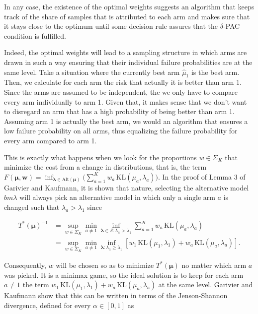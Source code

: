 \documentclass[12pt,]{article}
\newcommand{\KL}{\,\text{KL}}
\begin{document}
In any case, the existence of the optimal weights suggests an algorithm
that keeps track of the share of samples that is attributed to each arm
and makes sure that it stays close to the optimum until some decision
rule assures that the \(\delta\)-PAC condition is fulfilled.

Indeed, the optimal weights will lead to a sampling structure in which
arms are drawn in such a way ensuring that their individual failure
probabilities are at the same level. Take a situation where the
currently best arm \(\hat{\mu}_1\) is the best arm. Then, we calculate
for each arm the risk that actually it is better than arm 1. Since the
arms are assumed to be independent, the we only have to compare every
arm individually to arm 1. Given that, it makes sense that we don't want
to disregard an arm that has a high probability of being better than arm
1. Assuming arm 1 is actually the best arm, we would an algorithm that
ensures a low failure probability on all arms, thus equalizing the
failure probability for every arm compared to arm 1.

This is exactly what happens when we look for the proportions
\(w \in \Sigma_K\) that minimize the cost from a change in
distributions, that is, the term
\(F(\bm{\mu}, \bm{w}) = \inf_{\bm{\lambda} \in \text{Alt}(\bm{\mu})} \Big(\sum_{a= 1}^K w_a \KL(\mu_a, \lambda_a)\Big)\).
In the proof of Lemma 3 of Garivier and Kaufmann, it is shown that
nature, selecting the alternative model \(bm{\lambda}\) will always pick
an alternative model in which only a single arm \(a\) is changed such
that \(\lambda_a > \lambda_1\) since

\begin{align*}
T^*(\bm{\mu})^{-1} & = \sup_{w \in \Sigma_K} \min_{a \neq 1} \inf_{\bm{\lambda} \in \mathcal{S}: \lambda_a > \lambda_1} \sum_{a=1}^K w_a \KL(\mu_a, \lambda_a)  \\
& = \sup_{w \in \Sigma_K} \min_{a \neq 1} \inf_{\bm{\lambda}: \lambda_a \geq \lambda_1} [w_1 \KL(\mu_1, \lambda_1)+w_a \KL(\mu_a, \lambda_a)].
\end{align*}

Consequently, \(w\) will be chosen so as to minimize \(T^*(\bm{\mu})\)
no matter which arm \(a\) was picked. It is a minimax game, so the ideal
solution is to keep for each arm \(a \neq 1\) the term
\(w_1 \KL(\mu_1, \lambda_1) + w_a \KL(\mu_a, \lambda_a)\) at the same
level. Garivier and Kaufmann show that this can be written in terms of
the Jenson-Shannon divergence, defined for every \(\alpha \in [0,1]\) as
\end{document}
